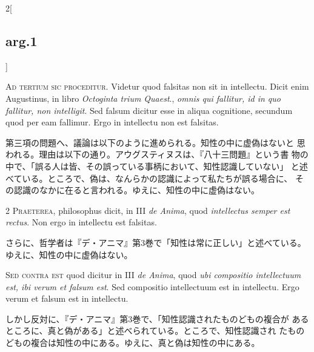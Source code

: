\documentclass[paper=a4paper,fontsize=10pt,jafontsize=9pt,titlepage]{jlreq}
\begin{document}
\begin{paracol}{2}[\subsection{arg.1}]


{\huge A}{\scshape d tertium sic proceditur}. Videtur quod falsitas non
sit in intellectu. Dicit enim Augustinus, in libro {\itshape Octoginta
trium Quaest}., {\itshape omnis qui fallitur, id in quo fallitur, non
intelligit}. Sed falsum dicitur esse in aliqua cognitione, secundum quod
per eam fallimur. Ergo in intellectu non est falsitas.

\switchcolumn

第三項の問題へ、議論は以下のように進められる。知性の中に虚偽はないと
思われる。理由は以下の通り。アウグスティヌスは、『八十三問題』という書
物の中で、「誤る人は皆、その誤っている事柄において、知性認識していない」
と述べている。ところで、偽は、なんらかの認識によって私たちが誤る場合に、
その認識のなかに在ると言われる。ゆえに、知性の中に虚偽はない。



{\scshape 2 Praeterea}, philosophus dicit, in III {\itshape de Anima},
quod {\itshape intellectus semper est rectus}. Non ergo in intellectu
est falsitas.

\switchcolumn

さらに、哲学者は『デ・アニマ』第3巻で「知性は常に正しい」と述べている。
 ゆえに、知性の中に虚偽はない。

\switchcolumn*[\subsection{s.c.}]


{\scshape Sed contra est} quod dicitur in III {\itshape de Anima},
quod {\itshape ubi compositio intellectuum est, ibi verum et falsum
est}. Sed compositio intellectuum est in intellectu. Ergo verum et
falsum est in intellectu.

\switchcolumn

しかし反対に、『デ・アニマ』第3巻で、「知性認識されたものどもの複合が
 あるところに、真と偽がある」と述べられている。ところで、知性認識され
 たものどもの複合は知性の中にある。ゆえに、真と偽は知性の中にある。




\end{paracol}
\end{document}
